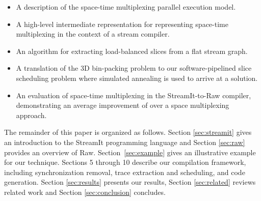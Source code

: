\begin{itemize}
\item A description of the space-time multiplexing parallel execution
model.
\item A high-level intermediate representation for representing
space-time multiplexing in the context of a stream compiler.  
\item An algorithm for extracting load-balanced slices from a flat
stream graph.
\item A translation of the 3D bin-packing problem to our
software-pipelined slice scheduling problem where simulated annealing
is used to arrive at a solution.
\item An evaluation of space-time multiplexing in the StreamIt-to-Raw
compiler, demonstrating an average improvement of  over a
space multiplexing approach.
\end{itemize}

The remainder of this paper is organized as follows.  Section
\ref{sec:streamit} gives an introduction to the StreamIt programming
language and Section \ref{sec:raw} provides an overview of
Raw. Section~\ref{sec:example} gives an illustrative example for our
technique.  Sections 5 through 10 describe our compilation framework,
including synchronization removal, trace extraction and scheduling,
and code generation.  Section \ref{sec:results} presents our results,
Section \ref{sec:related} reviews related work and Section
\ref{sec:conclusion} concludes.


